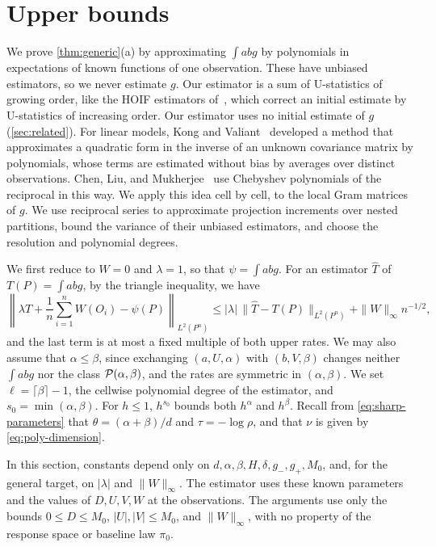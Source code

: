 \chapter{Upper bounds}\label{sec:upper-ideas}

We prove \cref{thm:generic}(a) by approximating $\int abg$ by
polynomials in expectations of known functions of one observation.
These have unbiased estimators, so we never estimate $g$. Our
estimator is a sum of U-statistics of growing order, like the HOIF
estimators of~\cite{hoif2008,robins}, which correct an initial estimate
by U-statistics of increasing order. Our estimator uses no initial
estimate of $g$ (\cref{sec:related}). For linear models, Kong
and Valiant~\cite{kongvaliant2018} developed a method that approximates
a quadratic form in the inverse of an unknown covariance matrix by
polynomials, whose terms are estimated without bias by averages over
distinct observations. Chen, Liu, and
Mukherjee~\cite[Section~3.2]{chenliumukherjee2025} use Chebyshev
polynomials of the reciprocal in this way. We apply this idea cell by
cell, to the local Gram matrices of $g$. We use
reciprocal series to approximate projection increments over nested
partitions, bound the variance of their unbiased estimators, and choose
the resolution and polynomial degrees.

We first reduce to $W=0$ and $\lambda=1$, so that $\psi=\int abg$. For an
estimator $\widehat T$ of $T(P)=\int abg$, by the triangle inequality, we
have
\[
 \left\|\lambda\widehat T+\frac1n\sum_{i=1}^nW(O_i)-\psi(P)\right\|_{L^2(P^n)}
 \le |\lambda|\,\|\widehat T-T(P)\|_{L^2(P^n)}
       +\|W\|_\infty n^{-1/2},
\]
and the last term is at most a fixed multiple of both upper rates. We may
also assume that $\alpha\le\beta$, since exchanging $(a,U,\alpha)$ with
$(b,V,\beta)$ changes neither $\int abg$ nor the class
$\mathcal P(\alpha,\beta)$, and the rates are symmetric in $(\alpha,\beta)$.
We set $\ell=\lceil\beta\rceil-1$, the cellwise polynomial degree of the
estimator, and $s_0=\min(\alpha,\beta)$. For $h\le1$, $h^{s_0}$ bounds both
$h^\alpha$ and $h^\beta$. Recall from \eqref{eq:sharp-parameters} that
$\theta=(\alpha+\beta)/d$ and $\tau=-\log\rho$, and that $\nu$ is given by
\eqref{eq:poly-dimension}.

In this section, constants depend only on
$d,\alpha,\beta,H,\delta,g_-,g_+,M_0$, and, for the general target, on
$|\lambda|$ and $\|W\|_\infty$. The estimator uses these known parameters
and the values of $D,U,V,W$ at the observations. The arguments use only
the bounds $0\le D\le M_0$, $|U|,|V|\le M_0$, and $\|W\|_\infty$, with no
property of the response space or baseline law $\pi_0$.

